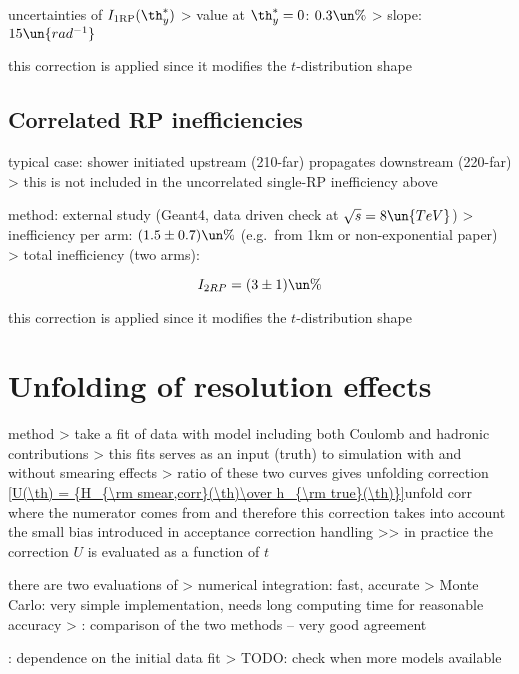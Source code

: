 \> uncertainties of $I_{\rm 1RP}(\th_y^*)$
\>> value at $\th_y^* = 0$: $0.3\un{\%}$
\>> slope: $15\un{rad^{-1}}$

\> this correction is applied since it modifies the $t$-distribution shape


\section[efficiency-correlated]{Correlated RP inefficiencies}

\> typical case: shower initiated upstream (210-far) propagates downstream (220-far)
\>> this is not included in the uncorrelated single-RP inefficiency above

\> method: external study (Geant4, data driven check at $\sqrt s = 8\un{TeV}$)
\>> inefficiency per arm: $(1.5 \pm 0.7)\un{\%}$ (e.g.~from 1km or non-exponential paper)
\>> total inefficiency (two arms):

$$I_{2RP} = (3 \pm 1)\un{\%}$$

\> this correction is applied since it modifies the $t$-distribution shape

\fi



\chapter[unfolding]{Unfolding of resolution effects}

\> method
\>> take a fit of data with model including both Coulomb and hadronic contributions
\>> this fits serves as an input (truth) to simulation with and without smearing effects
\>> ratio of these two curves gives unfolding correction
\eqref{U(\th) = {H_{\rm smear,corr}(\th)\over h_{\rm true}(\th)}}{unfold corr}
where the numerator comes from  and therefore this correction takes into account the small bias introduced in acceptance correction handling
\>>> in practice the correction $U$ is evaluated as a function of $t$

\> there are two evaluations of 
\>> numerical integration: fast, accurate
\>> Monte Carlo: very simple implementation, needs long computing time for reasonable accuracy
\>>  : comparison of the two methods -- very good agreement

\>  : dependence on the initial data fit
\>> TODO: check when more models available

